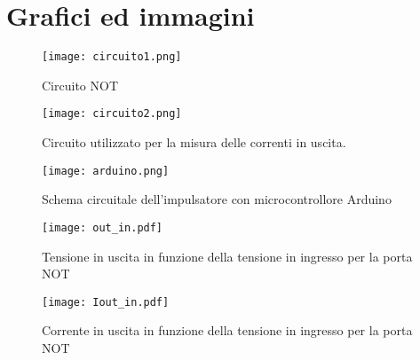 \section{Grafici ed immagini}
\begin{figure}[h]
	\centering
	\texttt{[image: circuito1.png]}
	\caption{Circuito NOT}
	\label{f:circuito1}
\end{figure}
\begin{figure}[h]
	\centering
	\texttt{[image: circuito2.png]}
	\caption{Circuito utilizzato per la misura delle correnti in uscita.}
           \label{f:circuito2}
\end{figure}

\begin{figure}[h]
	\centering
	\texttt{[image: arduino.png]}
	\caption{Schema circuitale dell'impulsatore con microcontrollore Arduino}
           \label{f:Circuito}
\end{figure}

\begin{figure}[h]
	\centering
	\texttt{[image: out\_in.pdf]}
	\caption{Tensione in uscita in funzione della tensione in ingresso per la porta NOT}
           \label{f:out_in}
\end{figure}
\begin{figure}[h]
	\centering
	\texttt{[image: Iout\_in.pdf]}
	\caption{Corrente in uscita in funzione della tensione in ingresso per la porta NOT}
           \label{f:Iout_in}
\end{figure}